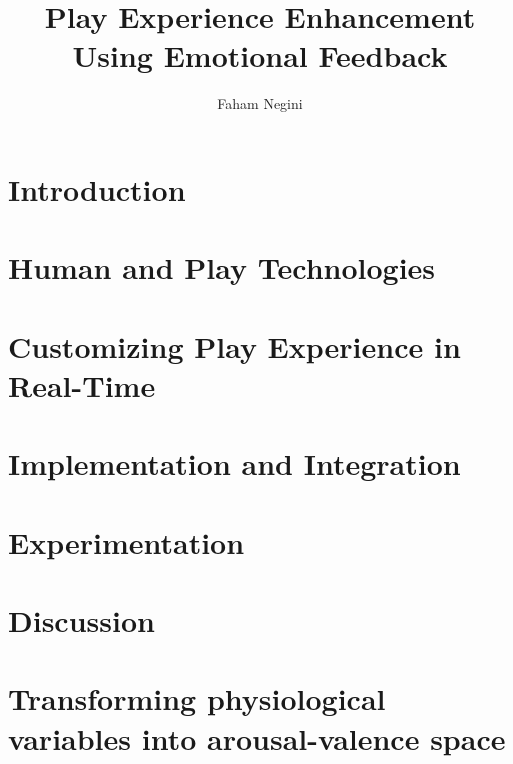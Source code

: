 \documentclass{uofsthesis-cs}
\title{Play Experience Enhancement Using Emotional Feedback}
\author{Faham Negini}
\begin{document}
\maketitle

\frontmatter


\chapter{Introduction}                             \label{chap:intro}      
\chapter{Human and Play Technologies}              \label{chap:man-n-play} 
\chapter{Customizing Play Experience in Real-Time} \label{chap:custmz}     
\chapter{Implementation and Integration}           \label{chap:impl}       
\chapter{Experimentation}                          \label{chap:exprm}      
\chapter{Discussion}                               \label{chap:discus}     




\uofsappendix
\chapter{Transforming physiological variables into arousal-valence space} \label{app:phys-to-av}    
\end{document}
